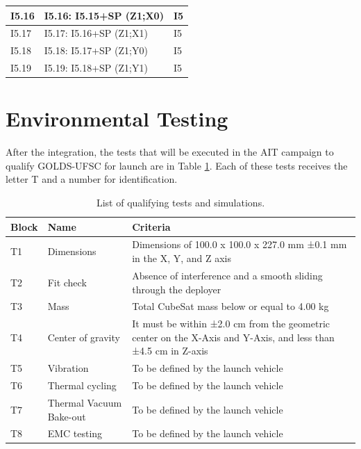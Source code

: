 \begin{table}[!htb]
\begin{tabular}{|l|l|l|}
        I5.16    & I5.16: I5.15+SP (Z1;X0)                                           & {I5} \\ \hline
        I5.17    & I5.17: I5.16+SP (Z1;X1)                                           & {I5} \\ \hline
        I5.18    & I5.18: I5.17+SP (Z1;Y0)                                           & {I5} \\ \hline
        I5.19    & I5.19: I5.18+SP (Z1;Y1)                                           & {I5} \\ \hline
	    \end{tabular}
\end{table}

\section{Environmental Testing}

After the integration, the tests that will be executed in the AIT campaign to qualify GOLDS-UFSC for launch are in Table \ref{table_test}. Each of these tests receives the letter T and a number for identification. %

\begin{table}[!htb]
\caption{\label{table_test}List of qualifying tests and simulations.}
\centering
\begin{tabular}{|l|l|l|}\hline
		Block & Name               & Criteria \\ \hline
	    T1    & Dimensions         & \parbox[t]{8cm}{Dimensions of 100.0 x 100.0 x 227.0 mm ±0.1 mm in the X, Y, and Z axis} \\ \hline
        T2    & Fit check         & \parbox[t]{8cm}{Absence of interference and a smooth sliding through the deployer} \\ \hline
	    T3    & Mass       & Total CubeSat mass below or equal to 4.00 kg              \\ \hline
	    T4    & Center of gravity       & \parbox[t]{8cm}{It must be within ±2.0 cm from the geometric center on the X-Axis and Y-Axis, and less than ±4.5 cm in Z-axis}            \\ \hline
        T5    & Vibration                 & To be defined by the launch vehicle      \\ \hline
        T6    & Thermal cycling           & To be defined by the launch vehicle       \\ \hline
	    T7    & Thermal Vacuum Bake-out   & To be defined by the launch vehicle       \\ \hline
        T8    & EMC testing                       & To be defined by the launch vehicle       \\ \hline 
	    \end{tabular}
\end{table}

